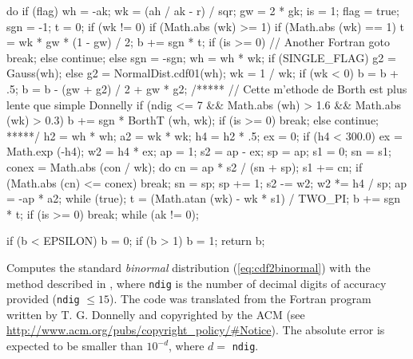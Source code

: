 \begin{code}
\begin{hide}
{      do {
         if (flag) {
            wh = -ak;
            wk = (ah / ak - r) / sqr;
            gw = 2 * gk;
            is = 1;
         }
         flag = true;
         sgn = -1;
         t = 0;
         if (wk != 0) {
            if (Math.abs (wk) >= 1)
               if (Math.abs (wk) == 1) {
                  t = wk * gw * (1 - gw) / 2;
                  b += sgn * t;
                  if (is >= 0)        // Another Fortran goto
                     break;
                  else
                     continue;
               } else {
                  sgn = -sgn;
                  wh = wh * wk;
                  if (SINGLE_FLAG)
                     g2 = Gauss(wh);
                  else
                     g2 = NormalDist.cdf01(wh);
                  wk = 1 / wk;
                  if (wk < 0)
                     b = b + .5;
                  b = b - (gw + g2) / 2 + gw * g2;
               }
        /*****
            // Cette m'ethode de Borth est plus lente que simple Donnelly 
            if (ndig <= 7 && Math.abs (wh) > 1.6 && Math.abs (wk) > 0.3) {
               b += sgn * BorthT (wh, wk);
               if (is >= 0)
                  break;
               else
                  continue;
            }
        *****/
            h2 = wh * wh;
            a2 = wk * wk;
            h4 = h2 * .5;
            ex = 0;
            if (h4 < 300.0)
               ex = Math.exp (-h4);
            w2 = h4 * ex;
            ap = 1;
            s2 = ap - ex;
            sp = ap;
            s1 = 0;
            sn = s1;
            conex = Math.abs (con / wk);
            do {
               cn = ap * s2 / (sn + sp);
               s1 += cn;
               if (Math.abs (cn) <= conex)
                  break;
               sn = sp;
               sp += 1;
               s2 -= w2;
               w2 *= h4 / sp;
               ap = -ap * a2;
            } while (true);
            t = (Math.atan (wk) - wk * s1) / TWO_PI;
            b += sgn * t;
         }
         if (is >= 0)
            break;
      } while (ak != 0);

      if (b < EPSILON)
         b = 0;
      if (b > 1)
         b = 1;
      return b;
}\end{hide}
\end{code}
\begin{tabb}
  Computes the standard {\em binormal\/} distribution (\ref{eq:cdf2binormal})
  with the method described in \cite{tDON73a}, where \texttt{ndig} is the
  number of decimal digits of accuracy provided (\texttt{ndig} $\le 15$).
  The code was translated from the Fortran program written by T. G. Donnelly
  and copyrighted by the ACM (see 
  \url{http://www.acm.org/pubs/copyright_policy/#Notice}). The absolute error
  is expected to be smaller than $10^{-d}$, where $d=$ \texttt{ndig}.
\end{tabb}
